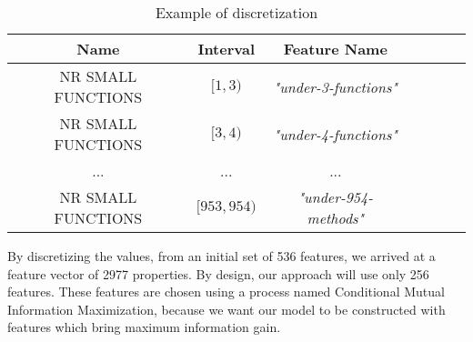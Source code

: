 \begin{table}[ht]
    \centering
    \begin{tabular}{| c | c | c | c | c | c | c | }
    \hline
    Name & Interval & Feature Name\\ \hline
    NR SMALL FUNCTIONS & $[1, 3)$ & \textit{"under-3-functions"}  \\ \hline
    NR SMALL FUNCTIONS & $[3, 4)$ & \textit{"under-4-functions"}  \\ \hline
    ... & ... & ... \\ \hline   
    NR SMALL FUNCTIONS & $[953, 954) $ & \textit{"under-954-methods"}  \\ \hline
    \end{tabular}
    \caption{Example of discretization} 
    \label{tab:discretizationeg}
\end{table}
\par
By discretizing the values, from an initial set of 536 features, we arrived at a feature vector of 2977 properties. By design, our approach will use only 256 features. These features are chosen using a process named Conditional Mutual Information Maximization, because we want our model to be constructed with features which bring maximum information gain.